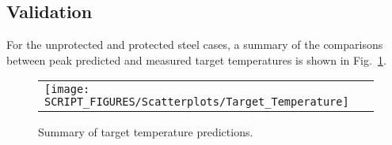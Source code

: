 \clearpage


\subsection*{Validation}

For the unprotected and protected steel cases, a summary of the comparisons between peak predicted and measured target temperatures is shown in Fig.~\ref{Target Temperature}.

\begin{figure}[!ht]
\begin{center}
\begin{tabular}{l}
\texttt{[image: SCRIPT\_FIGURES/Scatterplots/Target\_Temperature]}
\end{tabular}
\end{center}
\caption[Summary of target temperature predictions]
{Summary of target temperature predictions.}
\label{Target Temperature}
\end{figure}

